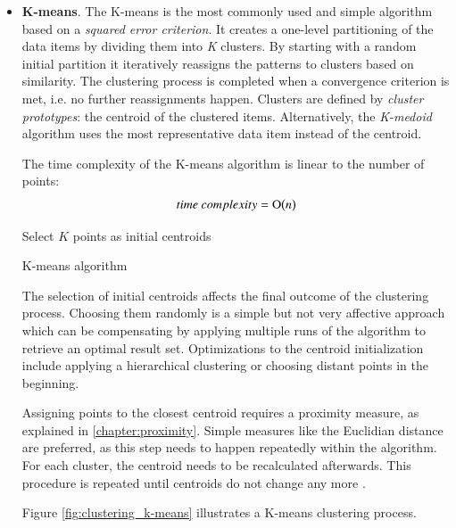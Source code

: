 \begin{itemize}

\item \textbf{K-means}. The K-means is the most commonly used and simple algorithm based on a \textit{squared error criterion}. It creates a one-level partitioning of the data items by dividing them into \textit{K} clusters. By starting with a random initial partition it iteratively reassigns the patterns to clusters based on similarity.  The clustering process is completed when a convergence criterion is met, i.e. no further reassignments happen. Clusters are defined by \textit{cluster prototypes}: the centroid of the clustered items. Alternatively, the \textit{K-medoid} algorithm uses the most representative data item instead of the centroid.

The time complexity of the K-means algorithm is linear to the number of points:
\[time~complexity = \operatorname{O}\bigl(n\bigr)\]

\begin{algorithm}[t]
  \BlankLine
  {Select $K$ points as initial centroids}\;
  \caption{K-means algorithm~\cite{Meert06clustermaps}}
  \label{lag:k-means}
\end{algorithm}

The selection of initial centroids affects the final outcome of the clustering process. Choosing them randomly is a simple but not very affective approach which can be compensating by applying multiple runs of the algorithm to retrieve an optimal result set. Optimizations to the centroid initialization include applying a hierarchical clustering or choosing distant points in the beginning.

Assigning points to the closest centroid requires a proximity measure, as explained in \ref{chapter:proximity}. Simple measures like the Euclidian distance are preferred, as this step needs to happen repeatedly within the algorithm. For each cluster, the centroid needs to be recalculated afterwards. This procedure is repeated until centroids do not change any more \cite{Jain99clusterreview, Meert06clustermaps}.

Figure \ref{fig:clustering_k-means} illustrates a K-means clustering process.


\end{itemize}
